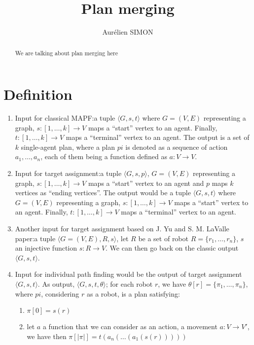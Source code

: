 \documentclass{llncs}
\begin{document}
\title{Plan merging}

\author{Aurélien SIMON}
\maketitle

\begin{abstract}
We are talking about plan merging here
\end{abstract}


\newpage
\section{Definition}

\begin{enumerate}
    \item Input for classical MAPF\cite{classical_mapf}:\@ a tuple \(\langle G,s,t \rangle \) where \(G=(V,E)\) representing a graph, \(s : [1,\ldots,k] \rightarrow V\) maps a ``start'' vertex to an agent. Finally,  \(t : [1,\ldots,k] \rightarrow V\) maps a ``terminal'' vertex to an agent. The output is a set of \(k\) single-agent plan, where a plan \(pi\) is denoted as a sequence of action \(a_1,\ldots,a_n\), each of them being a function defined as \(a : V \rightarrow V\).
    
    \item Input for target  assignment:\@ a tuple \(\langle G,s,p \rangle\), \(G=(V,E)\) representing a graph, \(s : [1,\ldots,k] \rightarrow V\) maps a ``start'' vertex to an agent and \(p\) maps \(k\) vertices as ``ending vertices''. The output would be a tuple \(\langle G,s,t \rangle \) where \(G=(V,E)\) representing a graph, \(s : [1,\ldots,k] \rightarrow V\) maps a ``start'' vertex to an agent. Finally,  \(t : [1,\ldots,k] \rightarrow V\) maps a ``terminal'' vertex to an agent.
    \item Another input for target assignment based on J. Yu and S. M. LaValle paper\cite{anonymous_mapf}:\@ a tuple \(\langle G=(V,E),R,s \rangle\), let \(R\) be a set of robot \(R =\{r_1,\ldots,r_n\}\), $s$ an injective function \(s : R \rightarrow V\). We can then go back on the classic output \(\langle G,s,t \rangle \).

    \item Input for individual path finding would be the output of target  assignment \(\langle G,s,t \rangle \). As output, \(\langle G,s,t, \theta \rangle \); for each robot \( r \), we have \( \theta[r] = \{\pi_1,\ldots,\pi_n\}\), where \(pi\), considering \(r\) as a robot, is a plan satisfying:
    \begin{enumerate}
        \item \(\pi[0] = s(r)\)
        \item let \(a\) a function that we can consider as an action, a movement \(a: V \rightarrow V'\), we have then \(\pi[|\pi|] = t(a_n(\ldots(a_1(s(r)))))\)
    \end{enumerate}


\end{enumerate}
\end{document}
